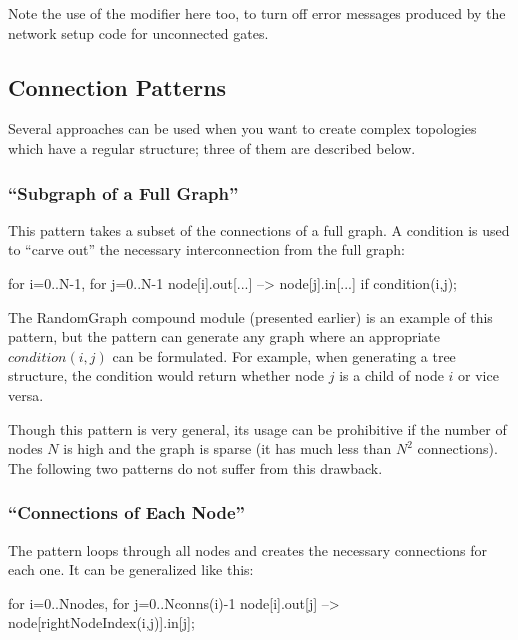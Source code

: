 Note the use of the  modifier
here too, to turn off error messages produced by the network setup code
for unconnected gates.


\subsection{Connection Patterns}


Several approaches can be used when you want to create complex
topologies which have a regular structure; three of them are
described below.


\subsubsection{``Subgraph of a Full Graph''}


This pattern takes a subset of the connections of a full graph.  A
condition is used to ``carve out'' the necessary interconnection from
the full graph:

\begin{ned}
for i=0..N-1, for j=0..N-1 {
    node[i].out[...] --> node[j].in[...] if condition(i,j);
}
\end{ned}

The RandomGraph compound module (presented earlier) is an example of
this pattern, but the pattern can generate any graph where an
appropriate $condition(i,j)$ can be formulated. For example,
when generating a tree structure, the condition
would return whether node $j$ is a child of node $i$ or
vice versa.

Though this pattern is very general, its usage can be prohibitive if
the number of nodes $N$ is high and the graph is sparse (it has
much less than $N^2$ connections). The following
two patterns do not suffer from this drawback.


\subsubsection{``Connections of Each Node''}

The pattern loops through all nodes and creates the necessary
connections for each one. It can be generalized like this:

\begin{ned}
for i=0..Nnodes, for j=0..Nconns(i)-1 {
    node[i].out[j] --> node[rightNodeIndex(i,j)].in[j];
}
\end{ned}

